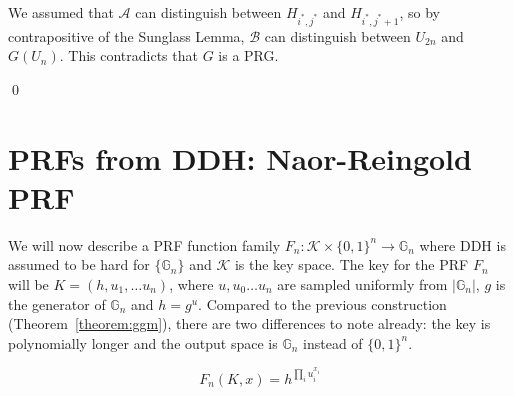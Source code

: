 \documentclass[12pt]{tufte-book}
\begin{document}
We assumed that $\mathcal{A}$ can distinguish between $H_{i^*, j^*}$ and $H_{i^*, j^*+1}$, so by contrapositive of the Sunglass Lemma, $\mathcal{B}$ can distinguish between $U_{2n}$ and $G(U_n)$. This contradicts that $G$ is a PRG.

\qed







\section{PRFs from DDH: Naor-Reingold PRF}
We will now describe a PRF function family $F_n: \mathcal{K} \times \{0,1\}^n \rightarrow \mathbb{G}_n$ where DDH is assumed to be hard for  $\{\mathbb{G}_n\}$ and $\mathcal{K}$ is the key space.
The key for the PRF $F_n$ will be $K =  (h, u_1, \ldots u_n)$, where $u,u_0\ldots u_n$ are sampled uniformly from $|\mathbb{G}_n|$, $g$ is the generator of $\mathbb{G}_n$ and $h = g^u$. Compared to the previous construction (Theorem~\ref{theorem:ggm}), there are two differences to note already: the key is polynomially longer and the output space is $\mathbb{G}_n$ instead of $\{0, 1\}^n$.

\[F_n(K,x) = h^{\prod_{i} u_i^{x_i}}\]
\end{document}
